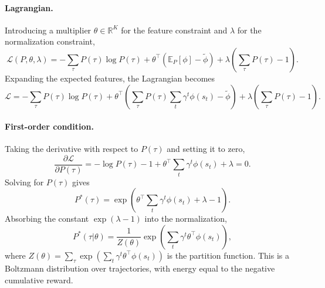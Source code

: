 \documentclass[10pt]{article}
\newcommand{\E}{\mathbb{E}}
\newcommand{\R}{\mathbb{R}}
\begin{document}
\paragraph{Lagrangian.}
Introducing a multiplier $\theta \in \R^K$ for the feature constraint and $\lambda$ for the normalization constraint,
\begin{equation}
\label{eq:maxent_lagrangian}
\mathcal{L}(P, \theta, \lambda) = -\sum_\tau P(\tau) \log P(\tau) + \theta^\top\!\left(\E_P[\phi] - \tilde\phi\right) + \lambda\!\left(\sum_\tau P(\tau) - 1\right).
\end{equation}
Expanding the expected features, the Lagrangian becomes
\begin{equation}
\mathcal{L} = -\sum_\tau P(\tau) \log P(\tau) + \theta^\top\!\left(\sum_\tau P(\tau) \sum_t \gamma^t \phi(s_t) - \tilde\phi\right) + \lambda\!\left(\sum_\tau P(\tau) - 1\right).
\end{equation}

\paragraph{First-order condition.}
Taking the derivative with respect to $P(\tau)$ and setting it to zero,
\begin{equation}
\frac{\partial \mathcal{L}}{\partial P(\tau)} = -\log P(\tau) - 1 + \theta^\top \sum_t \gamma^t \phi(s_t) + \lambda = 0.
\end{equation}
Solving for $P(\tau)$ gives
\begin{equation}
P^*(\tau) = \exp\!\left(\theta^\top \sum_t \gamma^t \phi(s_t) + \lambda - 1\right).
\end{equation}
Absorbing the constant $\exp(\lambda - 1)$ into the normalization,
\begin{equation}
\label{eq:boltzmann_traj}
P^*(\tau|\theta) = \frac{1}{Z(\theta)} \exp\!\left(\sum_t \gamma^t \theta^\top \phi(s_t)\right),
\end{equation}
where $Z(\theta) = \sum_\tau \exp\!\left(\sum_t \gamma^t \theta^\top \phi(s_t)\right)$ is the partition function. This is a Boltzmann distribution over trajectories, with energy equal to the negative cumulative reward.
\end{document}
